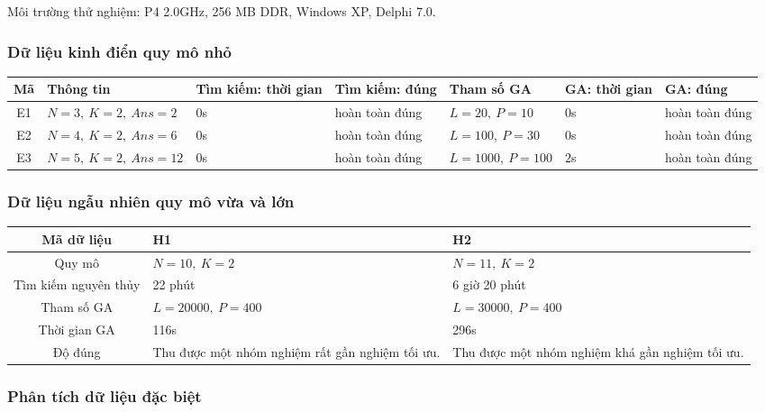 \documentclass[11pt]{article}
\begin{document}
\noindent Môi trường thử nghiệm: P4 2.0GHz, 256 MB DDR, Windows XP, Delphi
7.0.

\subsubsection{Dữ liệu kinh điển quy mô nhỏ}

\begin{center}
\begingroup
\scriptsize
\setlength{\tabcolsep}{3pt}
\begin{tabular}{c|p{2.2cm}|p{1.8cm}|p{1.8cm}|p{2.2cm}|p{1.6cm}|p{1.8cm}}
\textbf{Mã} & \textbf{Thông tin} & \textbf{Tìm kiếm: thời gian} &
\textbf{Tìm kiếm: đúng} & \textbf{Tham số GA} &
\textbf{GA: thời gian} & \textbf{GA: đúng}\\ \hline
E1 & \(N=3,\ K=2,\ Ans=2\) & \(0\)s & hoàn toàn đúng &
\(L=20,\ P=10\) & \(0\)s & hoàn toàn đúng\\
E2 & \(N=4,\ K=2,\ Ans=6\) & \(0\)s & hoàn toàn đúng &
\(L=100,\ P=30\) & \(0\)s & hoàn toàn đúng\\
E3 & \(N=5,\ K=2,\ Ans=12\) & \(0\)s & hoàn toàn đúng &
\(L=1000,\ P=100\) & \(2\)s & hoàn toàn đúng
\end{tabular}
\endgroup
\end{center}

\subsubsection{Dữ liệu ngẫu nhiên quy mô vừa và lớn}

\begin{center}
\small
\begin{tabular}{c|p{4.5cm}|p{4.5cm}}
\textbf{Mã dữ liệu} & \textbf{H1} & \textbf{H2}\\ \hline
Quy mô & \(N=10,\ K=2\) & \(N=11,\ K=2\)\\
Tìm kiếm nguyên thủy & 22 phút & 6 giờ 20 phút\\
Tham số GA & \(L=20000,\ P=400\) & \(L=30000,\ P=400\)\\
Thời gian GA & 116s & 296s\\
Độ đúng & Thu được một nhóm nghiệm rất gần nghiệm tối ưu. &
Thu được một nhóm nghiệm khá gần nghiệm tối ưu.
\end{tabular}
\end{center}

\subsubsection{Phân tích dữ liệu đặc biệt}
\end{document}
